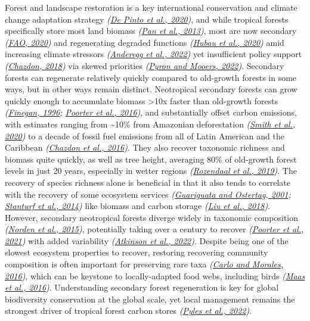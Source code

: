 \documentclass[
  12pt,
]{article}
\begin{document}
Forest and landscape restoration is a key international conservation and climate change adaptation strategy \emph{(\protect\hyperlink{ref-depinto20}{De Pinto et al., 2020})}, and while tropical forests specifically store most land biomass \emph{(\protect\hyperlink{ref-pan13}{Pan et al., 2013})}, most are now secondary \emph{(\protect\hyperlink{ref-fao20}{FAO, 2020})} and regenerating degraded functions \emph{(\protect\hyperlink{ref-hubau20}{Hubau et al., 2020})} amid increasing climate stressors \emph{(\protect\hyperlink{ref-anderegg22}{Anderegg et al., 2022})} yet insufficient policy support \emph{(\protect\hyperlink{ref-chazdon18}{Chazdon, 2018})} via skewed priorities \emph{(\protect\hyperlink{ref-pyron22}{Pyron and Mooers, 2022})}.
Secondary forests can regenerate relatively quickly compared to old-growth forests in some ways, but in other ways remain distinct.
Neotropical secondary forests can grow quickly enough to accumulate biomass \textgreater10x faster than old-growth forests \emph{(\protect\hyperlink{ref-finegan96}{Finegan, 1996}; \protect\hyperlink{ref-poorter16}{Poorter et al., 2016})}, and substantially offset carbon emissions, with estimates ranging from \textasciitilde10\% from Amazonian deforestation \emph{(\protect\hyperlink{ref-smith20}{Smith et al., 2020})} to a decade of fossil fuel emissions from all of Latin American and the Caribbean \emph{(\protect\hyperlink{ref-chazdon16}{Chazdon et al., 2016})}.
They also recover taxonomic richness and biomass quite quickly, as well as tree height, averaging 80\% of old-growth forest levels in just 20 years, especially in wetter regions \emph{(\protect\hyperlink{ref-rozendaal19}{Rozendaal et al., 2019})}.
The recovery of species richness alone is beneficial in that it also tends to correlate with the recovery of some ecosystem services \emph{(\protect\hyperlink{ref-guariguata01}{Guariguata and Ostertag, 2001}; \protect\hyperlink{ref-stanturf14}{Stanturf et al., 2014})} like biomass and carbon storage \emph{(\protect\hyperlink{ref-liu18}{Liu et al., 2018})}.
However, secondary neotropical forests diverge widely in taxonomic composition \emph{(\protect\hyperlink{ref-norden15}{Norden et al., 2015})}, potentially taking over a century to recover \emph{(\protect\hyperlink{ref-poorter21}{Poorter et al., 2021})} with added variability \emph{(\protect\hyperlink{ref-atkinson22}{Atkinson et al., 2022})}.
Despite being one of the slowest ecosystem properties to recover, restoring recovering community composition is often important for preserving rare taxa \emph{(\protect\hyperlink{ref-carlo16}{Carlo and Morales, 2016})}, which can be keystone to locally-adapted food webs, including birds \emph{(\protect\hyperlink{ref-maas16}{Maas et al., 2016})}.
Understanding secondary forest regeneration is key for global biodiversity conservation at the global scale, yet local management remains the strongest driver of tropical forest carbon stores \emph{(\protect\hyperlink{ref-pyles22}{Pyles et al., 2022})}.
\end{document}
